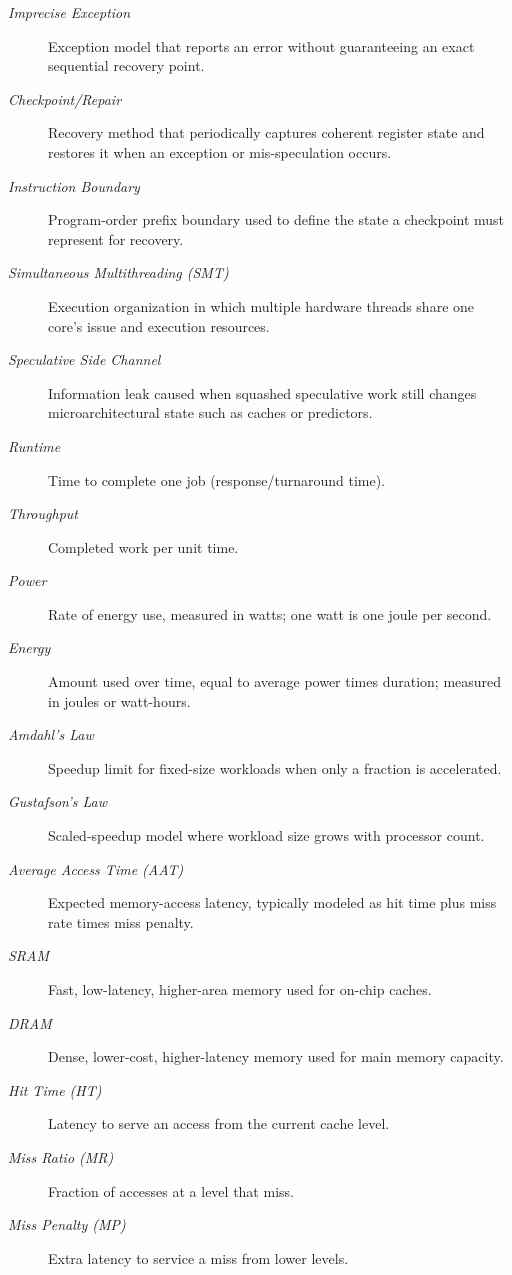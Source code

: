\begin{description}
    \item[\textit{Imprecise Exception}] Exception model that reports an error without guaranteeing an exact sequential recovery point.
    \item[\textit{Checkpoint/Repair}] Recovery method that periodically captures coherent register state and restores it when an exception or mis-speculation occurs.
    \item[\textit{Instruction Boundary}] Program-order prefix boundary used to define the state a checkpoint must represent for recovery.
    \item[\textit{Simultaneous Multithreading (SMT)}] Execution organization in which multiple hardware threads share one core's issue and execution resources.
    \item[\textit{Speculative Side Channel}] Information leak caused when squashed speculative work still changes microarchitectural state such as caches or predictors.
    \item[\textit{Runtime}] Time to complete one job (response/turnaround time).
    \item[\textit{Throughput}] Completed work per unit time.
    \item[\textit{Power}] Rate of energy use, measured in watts; one watt is one joule per second.
    \item[\textit{Energy}] Amount used over time, equal to average power times duration; measured in joules or watt-hours.
    \item[\textit{Amdahl's Law}] Speedup limit for fixed-size workloads when only a fraction is accelerated.
    \item[\textit{Gustafson's Law}] Scaled-speedup model where workload size grows with processor count.
    \item[\textit{Average Access Time (AAT)}] Expected memory-access latency, typically modeled as hit time plus miss rate times miss penalty.
    \item[\textit{SRAM}] Fast, low-latency, higher-area memory used for on-chip caches.
    \item[\textit{DRAM}] Dense, lower-cost, higher-latency memory used for main memory capacity.
    \item[\textit{Hit Time (HT)}] Latency to serve an access from the current cache level.
    \item[\textit{Miss Ratio (MR)}] Fraction of accesses at a level that miss.
    \item[\textit{Miss Penalty (MP)}] Extra latency to service a miss from lower levels.

\end{description}
